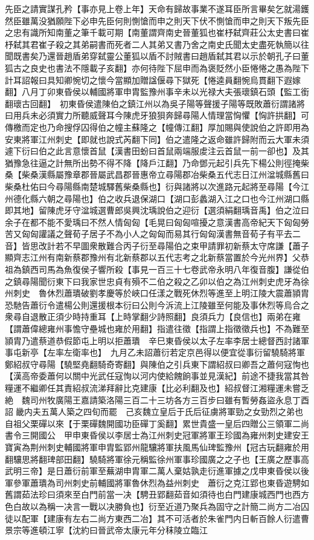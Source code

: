 先臣之請實謀孔矜【事亦見上卷上年】天命有歸故事業不遂耳臣所言畢矣乞就湯鑊然臣雖萬没猶願陛下必申先臣何則惻愴而申之則天下伏不惻愴而申之則天下叛先臣之忠有識所知南董之筆千載可期【南董謂齊南史晉董狐也崔杼弑齊莊公太史書曰崔杼弑其君崔子殺之其弟嗣書而死者二人其弟又書乃舍之南史氏聞太史盡死執簡以往聞既書矣乃還晉趙盾弟穿弑靈公董狐以盾不討賊書曰趙盾弑其君以示於朝孔子曰董狐古之良史也書法不隱載子亥翻】亦何待陛下屈申而為褒貶然小臣惓惓之愚為陛下計耳詔報曰具知卿惋切之懷今當顯加贈諡偃尋下獄死【惓逵員翻惋烏貫翻下遐嫁翻】八月丁卯東昏侯以輔國將軍申胄監豫州事辛未以光禄大夫張瓌鎮石頭【監工銜翻瓌古回翻】　初東昏侯遣陳伯之鎮江州以為吳子陽等聲援子陽等既敗蕭衍謂諸將曰用兵未必須實力所聽威聲耳今陳虎牙狼狽奔歸尋陽人情理當恟懼【恟許拱翻】可傳檄而定也乃命搜俘囚得伯之幢主蘇隆之【幢傳江翻】厚加賜與使說伯之許即用為安東將軍江州刺史【即就也說式芮翻下同】伯之遣隆之返命雖許歸附而云大軍未須遽下衍曰伯之此言意懷首鼠【漢書田蚡曰首鼠兩端服䖍注云首鼠一前一卻也】及其猶豫急往逼之計無所出勢不得不降【降戶江翻】乃命鄧元起引兵先下楊公則徑掩柴桑【柴桑漢縣屬豫章郡晉屬武昌郡晉惠帝立尋陽郡冶柴桑五代志日江州湓城縣舊曰柴桑杜佑曰今尋陽縣南楚城驛舊柴桑縣也】衍與諸將以次進路元起將至尋陽【今江州德化縣六朝之尋陽也】伯之收兵退保湖口【湖口彭蠡湖入江之口也今江州湖口縣即其地】留陳虎牙守湓城選曹郎吳興沈瑀說伯之迎衍【選須絹翻瑀音禹】伯之泣曰余子在都不能不愛瑀曰不然人情匈匈【毛晃曰匈匈喧擾之意漢書高帝紀天下匈匈勞苦又匈匈讙議之聲荀子居子不為小人之匈匈而易其行匈匈漢書無音荀子有平去二音】皆思改計若不早圖衆散難合丙子衍至尋陽伯之束甲請罪初新蔡太守席謙【蕭子顯齊志江州有南新蔡郡豫州有北新蔡郡以五代志考之北新蔡當置於今光州界】父恭祖為鎮西司馬為魚復侯子響所殺【事見一百三十七卷武帝永明八年復音腹】謙從伯之鎮尋陽聞衍東下曰我家世忠貞有殞不二伯之殺之乙卯以伯之為江州刺史虎牙為徐州刺史　魯休烈蕭璝破劉孝慶等於峽口任漾之戰死休烈等進至上明江陵大震蕭頴胄恐馳告蕭衍令遣楊公則還援根本衍曰公則今泝流上江陵雖至何能及事休烈等烏合之衆尋自退散正須少時持重耳【上時掌翻少詩照翻】良須兵力【良信也】兩弟在雍【謂蕭偉總雍州事憺守壘城也雍於用翻】指遣往徵【指謂上指徵徵兵也】不為難至頴胄乃遣蔡道恭假節屯上明以拒蕭璝　辛巳東昏侯以太子左率李居士總督西討諸軍事屯新亭【左率左衛率也】　九月乙未詔蕭衍若定京邑得以便宜從事衍留驍騎將軍鄭紹叔守尋陽【驍堅堯翻騎奇寄翻】與陳伯之引兵東下謂紹叔曰卿吾之蕭何寇恂也【漢高帝委蕭何以關中光武任寇恂以河内使給餽餉事並見漢紀】前途不捷我當其咎糧運不繼卿任其責紹叔流涕拜辭比克建康【比必利翻及也】紹叔督江湘糧運未嘗乏絶　魏司州牧廣陽王嘉請築洛陽三百二十三坊各方三百步曰雖有暫勞姦盜永息丁酉詔畿内夫五萬人築之四旬而罷　己亥魏立皇后于氏后征虜將軍勁之女勁烈之弟也自祖父栗磾以來【于栗磾魏開國功臣磾丁奚翻】累世貴盛一皇后四贈公三領軍二尚書令三開國公　甲申東昏侯以李居士為江州刺史冠軍將軍王珍國為雍州刺史建安王寶寅為荆州刺史輔國將軍申胄監郢州龍驤將軍扶風馬仙琕監豫州【冠古玩翻雍於用翻驤思將翻琕部田翻】驍騎將軍徐元稱監徐州軍事珍國廣之之子也【王廣之歷事高武明三帝】是日蕭衍前軍至蕪湖申胄軍二萬人棄姑孰走衍進軍據之戊申東昏侯以後軍參軍蕭璝為司州刺史前輔國將軍魯休烈為益州刺史　蕭衍之克江郢也東昏遊騁如舊謂茹法珍曰須來至白門前當一决【騁丑郢翻茹音如須待也白門建康城西門也西方色白故以為稱一决言一戰以决勝負也】衍至近道乃聚兵為固守之計簡二尚方二冶囚徒以配軍【建康有左右二尚方東西二冶】其不可活者於朱雀門内日斬百餘人衍遣曹景宗等進頓江寧【沈約曰晉武帝太康元年分秣陵立臨江